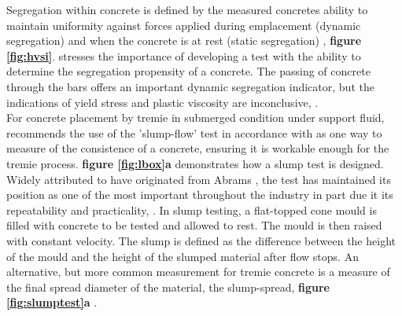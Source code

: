 \noindent
Segregation within concrete is defined by the measured concretes ability to maintain uniformity against forces applied during emplacement (dynamic segregation) and when the concrete is at rest (static segregation) \citep{turgut12}, {\bfseries figure \ref{fig:hvsi}}. \citet{mouret08} stresses the importance of developing a test with the ability to determine the segregation propensity of a concrete. The passing of concrete through the bars offers an important dynamic segregation indicator, but the indications of yield stress and plastic viscosity are inconclusive, \citet{karsten}.\\
\newline
\noindent
For concrete placement by tremie in submerged condition under support fluid, \citet{Sperwall} recommends the use of the 'slump-flow' test in accordance with \citeauthor{BS123508} as one way to measure of the consistence of a concrete, ensuring it is workable enough for the tremie process. {\bfseries figure \ref{fig:lbox}a} demonstrates how a slump test is designed. Widely attributed to have originated from Abrams \citep{graf33}, the test has maintained its position as one of the most important throughout the industry \citep{bartos02} in part due it its repeatability and practicality, \citeauthor{BS123508}. In slump testing, a flat-topped cone mould is filled with concrete to be tested and allowed to rest. The mould is then raised with constant velocity. The slump is defined as the difference between the height of the mould and the height of the slumped material after flow stops. An alternative, but more common measurement for tremie concrete is a measure of the final spread diameter of the material, the slump-spread, {\bfseries figure \ref{fig:slumptest}a} \citep{GAO15}.\\
